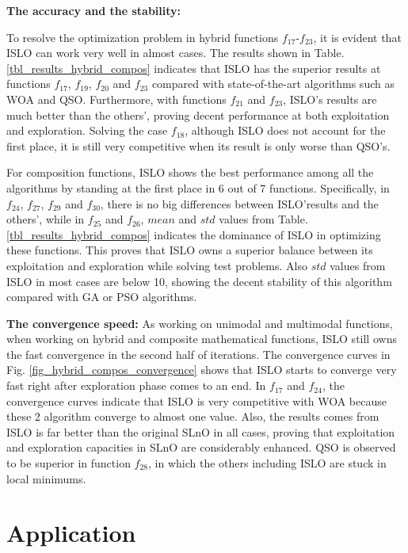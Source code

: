 \documentclass[../main.tex]{subfiles}
\begin{document}
	
	\textbf{The accuracy and the stability:} 
	
	To resolve the optimization problem in hybrid functions $f_{17}$-$f_{23}$, it is evident that ISLO can work very well in almost cases. The results shown in Table. \ref{tbl_results_hybrid_compos} indicates that ISLO has the superior results at functions $f_{17}$, $f_{19}$, $f_{20}$ and $f_{23}$ compared with state-of-the-art algorithms such as WOA and QSO. Furthermore, with functions $f_{21}$ and $f_{23}$, ISLO's results are much better than the others', proving decent performance at both exploitation and exploration. Solving the case $f_{18}$, although ISLO does not account for the first place, it is still very competitive when its result is only worse than QSO's.
	
	For composition functions, ISLO shows the best performance among all the algorithms by standing at the first place in 6 out of 7 functions. Specifically, in $f_{24}$, $f_{27}$, $f_{29}$ and $f_{30}$, there is no big differences between ISLO'results and the others', while in $f_{25}$ and $f_{26}$, $mean$ and $std$ values from Table. \ref{tbl_results_hybrid_compos} indicates the dominance of ISLO in optimizing these functions. This proves that ISLO owns a superior balance between its exploitation and exploration while solving test problems. Also $std$ values from ISLO in most cases are below 10, showing the decent stability of this algorithm compared with GA or PSO algorithms.
	
	\textbf{The convergence speed:} As working on unimodal and multimodal functions, when working on hybrid and composite mathematical functions, ISLO still owns the fast convergence in the second half of iterations. The convergence curves in Fig. \ref{fig_hybrid_compos_convergence} shows that ISLO starts to converge very fast right after exploration phase comes to an end. In $f_{17}$ and $f_{24}$, the convergence curves indicate that ISLO is very competitive with WOA because these 2 algorithm converge to almost one value. Also, the results comes from ISLO is far better than the original SLnO in all cases, proving that exploitation and exploration capacities in SLnO are considerably enhanced. QSO is observed to be superior in function $f_{28}$, in which the others including ISLO are stuck in local minimums.   

\section{Application}
\label{sec:exp_app}
	
\end{document}
